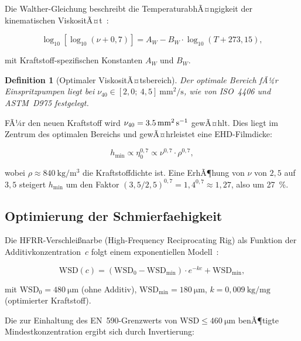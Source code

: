 ﻿\documentclass[12pt,a4paper]{article}
\newtheorem{definition}[theorem]{Definition}
\newcommand{\WSD}{\ensuremath{\mathrm{WSD}}}
\begin{document}
Die Walther-Gleichung beschreibt die TemperaturabhÃ¤ngigkeit der
kinematischen ViskositÃ¤t~\cite{astm_d341}:

\begin{equation}
  \log_{10}\!\left[\log_{10}\!\left(\nu + 0{,}7\right)\right]
  = A_W - B_W \cdot \log_{10}\!\left(T + 273{,}15\right),
  \label{eq:walther}
\end{equation}

mit Kraftstoff-spezifischen Konstanten $A_W$ und $B_W$.

\begin{definition}[Optimaler ViskositÃ¤tsbereich]
Der optimale Bereich fÃ¼r Einspritzpumpen liegt bei
$\nu_{40} \in [2{,}0;\ 4{,}5]\ \si{\mm\squared\per\s}$,
wie von ISO~4406 und ASTM~D975 festgelegt.
\end{definition}

FÃ¼r den neuen Kraftstoff wird $\nu_{40} = \SI{3{,}5}{\mm\squared\per\s}$
gewÃ¤hlt. Dies liegt im Zentrum des optimalen Bereichs und gewÃ¤hrleistet
eine EHD-Filmdicke:

\begin{equation}
  h_{\min} \propto \eta_0^{0{,}7} \propto \nu^{0{,}7} \cdot \rho^{0{,}7},
\end{equation}

wobei $\rho \approx \SI{840}{\kg\per\m\cubed}$ die Kraftstoffdichte ist.
Eine ErhÃ¶hung von $\nu$ von $2{,}5$ auf $3{,}5$ steigert $h_{\min}$ um
den Faktor $(3{,}5/2{,}5)^{0{,}7} = 1{,}4^{0{,}7} \approx 1{,}27$,
also um \SI{27}{\percent}.

\subsection{Optimierung der Schmierfaehigkeit}
\label{sec:kraftstoff_schmierung}

Die HFRR-Verschlei\ss{}narbe (High-Frequency Reciprocating Rig) als Funktion
der Additivkonzentration~$c$ folgt einem exponentiellen Modell~\cite{kerschbaumer2002}:

\begin{equation}
  \WSD(c) = (\WSD_0 - \WSD_{\min}) \cdot e^{-k c} + \WSD_{\min},
  \label{eq:wsd_additiv}
\end{equation}

mit $\WSD_0 = \SI{480}{\micro\m}$ (ohne Additiv), $\WSD_{\min} = \SI{180}{\micro\m}$,
$k = 0{,}009\ \si{\kg\per\mg}$ (optimierter Kraftstoff).

Die zur Einhaltung des EN~590-Grenzwerts von $\WSD \leq \SI{460}{\micro\m}$
benÃ¶tigte Mindestkonzentration ergibt sich durch Invertierung:
\end{document}
